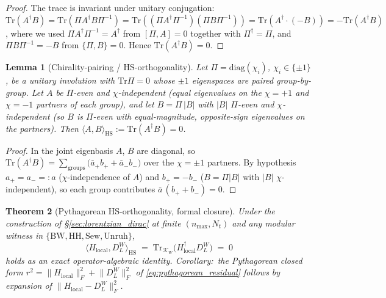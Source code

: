 \documentclass[11pt,a4paper]{article}
\theoremstyle{plain}
\newtheorem{theorem}{Theorem}[section]
\newtheorem{lemma}[theorem]{Lemma}
\theoremstyle{definition}
\newcommand{\nmax}{n_{\max}}
\newcommand{\Nt}{N_t}
\newcommand{\Frob}[1]{\lVert #1 \rVert_{F}}
\newcommand{\Tr}{\mathrm{Tr}}
\newcommand{\DL}{D_{L}}
\begin{document}
\begin{proof}
The trace is invariant under unitary conjugation:\
$\Tr(A^{\dagger} B) = \Tr(\Pi A^{\dagger} B \Pi^{-1}) =
\Tr((\Pi A^{\dagger} \Pi^{-1})(\Pi B \Pi^{-1}))
= \Tr(A^{\dagger} \cdot (-B)) = -\Tr(A^{\dagger} B)$,
where we used $\Pi A^{\dagger} \Pi^{-1} = A^{\dagger}$ from
$[\Pi, A] = 0$ together with $\Pi^{\dagger} = \Pi$, and
$\Pi B \Pi^{-1} = -B$ from $\{\Pi, B\} = 0$. Hence
$\Tr(A^{\dagger} B) = 0$.
\end{proof}

\begin{lemma}[Chirality-pairing / HS-orthogonality]\label{lem:pairing_HS}
Let $\Pi = \mathrm{diag}(\chi_{i})$, $\chi_{i} \in \{\pm1\}$, be a unitary
involution with $\Tr\Pi = 0$ whose $\pm1$ eigenspaces are paired
group-by-group. Let $A$ be $\Pi$-even and \emph{$\chi$-independent}
(equal eigenvalues on the $\chi = +1$ and $\chi = -1$ partners of each
group), and let $B = \Pi\,|B|$ with $|B|$ $\Pi$-even and $\chi$-independent
(so $B$ is $\Pi$-even with equal-magnitude, opposite-sign eigenvalues on
the partners). Then
$\langle A, B\rangle_{\mathrm{HS}} := \Tr(A^{\dagger}B) = 0$.
\end{lemma}

\begin{proof}
In the joint eigenbasis $A$, $B$ are diagonal, so
$\Tr(A^{\dagger}B) = \sum_{\mathrm{groups}}
\big(\bar a_{+}b_{+} + \bar a_{-}b_{-}\big)$ over the $\chi = \pm1$
partners. By hypothesis $a_{+} = a_{-} =: a$ ($\chi$-independence of $A$)
and $b_{+} = -b_{-}$ ($B = \Pi|B|$ with $|B|$ $\chi$-independent), so each
group contributes $\bar a\,(b_{+} + b_{-}) = 0$.
\end{proof}

\begin{theorem}[Pythagorean HS-orthogonality, formal closure]
\label{thm:pythagorean_formal}
Under the construction of \S\ref{sec:lorentzian_dirac} at finite
$(\nmax, \Nt)$ and any modular witness in
$\{\mathrm{BW}, \mathrm{HH}, \mathrm{Sew}, \mathrm{Unruh}\}$,
$$
\big\langle H_{\mathrm{local}}, \DL^{W} \big\rangle_{\mathrm{HS}}
\;=\; \Tr_{\mathcal{K}_{W}}\!\big(H_{\mathrm{local}}^{\dagger}
\DL^{W}\big) \;=\; 0
$$
holds as an exact operator-algebraic identity. Corollary:\ the
Pythagorean closed form $r^{2} =
\Frob{H_{\mathrm{local}}}^{2} + \Frob{\DL^{W}}^{2}$ of
\eqref{eq:pythagorean_residual} follows by expansion of
$\Frob{H_{\mathrm{local}} - \DL^{W}}^{2}$.
\end{theorem}
\end{document}
